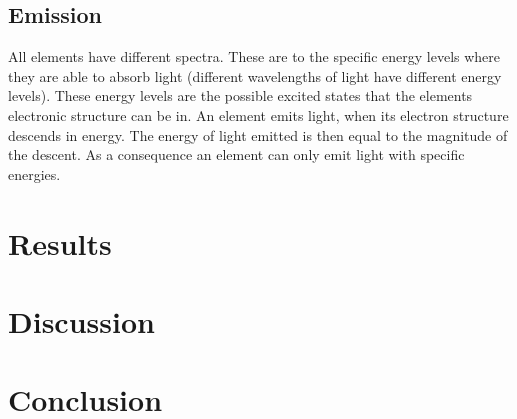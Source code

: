 \documentclass[working, oneside]{inputs/tuftebook}
\begin{document}
\subsection*{Emission}
All elements have different spectra. These are to the specific energy levels where they are able to absorb light (different wavelengths of light have different energy levels). These energy levels are the possible excited states that the elements electronic structure can be in. An element emits light, when its electron structure descends in energy. The energy of light emitted is then equal to the magnitude of the descent. As a consequence an element can only emit light with specific energies.
\section*{Results}
\section*{Discussion}
\section*{Conclusion}
\end{document}
